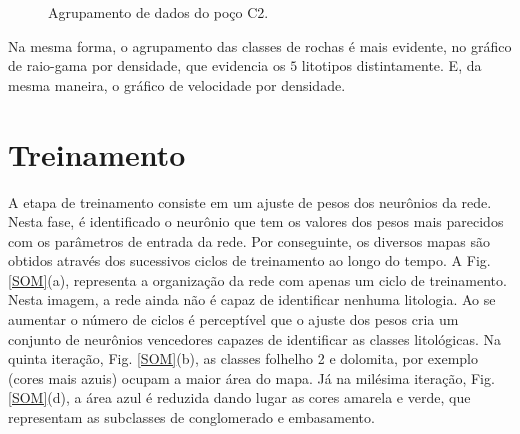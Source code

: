 \begin{figure}[H]
	\centering
	\setlength{\fboxsep}{8pt}
	\setlength{\fboxrule}{0.1pt}
	\caption{Agrupamento de dados do poço C2.}
	\label{clusterC2}
\end{figure} 

Na mesma forma, o agrupamento das classes de rochas é mais evidente, no gráfico de raio-gama por densidade, que evidencia os $5$ litotipos distintamente. E, da mesma maneira, o gráfico de velocidade por densidade.

\section{Treinamento}

A etapa de treinamento consiste em um ajuste de pesos dos neurônios da rede. Nesta fase, é identificado o neurônio que tem os valores dos pesos mais parecidos com os parâmetros de entrada da rede.  Por conseguinte, os diversos mapas são obtidos através dos sucessivos ciclos de treinamento ao longo do tempo. A Fig. \ref{SOM}(a), representa a organização da rede com apenas um ciclo de treinamento. Nesta imagem, a rede ainda não é capaz de identificar nenhuma litologia. Ao se aumentar o número de ciclos é perceptível que o ajuste dos pesos cria um conjunto de neurônios vencedores capazes de identificar as classes litológicas. Na quinta iteração, Fig. \ref{SOM}(b), as classes folhelho 2 e dolomita, por exemplo (cores mais azuis) ocupam a maior área do mapa. Já na milésima iteração, Fig. \ref{SOM}(d), a área azul é reduzida dando lugar as cores amarela e verde, que representam as subclasses de conglomerado e embasamento.

